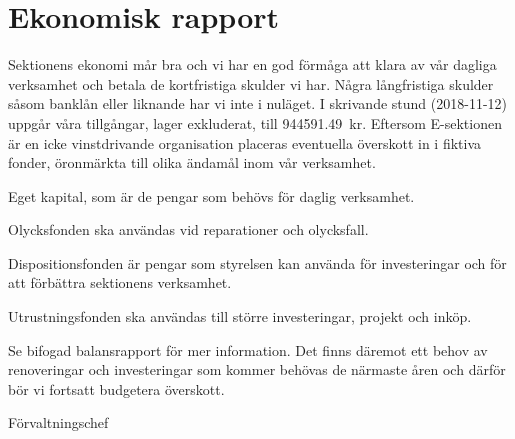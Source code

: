 \documentclass[../_main/handlingar.tex]{subfiles}
\begin{document}
\section{Ekonomisk rapport}
Sektionens ekonomi mår bra och vi har en god förmåga att klara av vår dagliga verksamhet och betala de kortfristiga skulder vi har. Några långfristiga skulder såsom banklån eller liknande har vi inte i nuläget.
I skrivande stund (2018-11-12) uppgår våra tillgångar, lager exkluderat, till \SI{944 591,49}{kr}. Eftersom E-sektionen är en icke vinstdrivande organisation placeras eventuella överskott in i fiktiva fonder, öronmärkta till olika ändamål inom vår verksamhet.
\begin{dashlist}
    \item Eget kapital, som är de pengar som behövs för daglig verksamhet.
    \item Olycksfonden ska användas vid reparationer och olycksfall.
    \item Dispositionsfonden är pengar som styrelsen kan använda för investeringar och för att förbättra sektionens verksamhet.
    \item Utrustningsfonden ska användas till större investeringar, projekt och inköp.
\end{dashlist}

Se bifogad balansrapport för mer information. Det finns däremot ett behov av renoveringar och investeringar som kommer behövas de närmaste åren och därför bör vi fortsatt budgetera överskott.

\begin{signatures}{1}
    \mvh
    \signature{Magnus Lundh}{Förvaltningschef}
\end{signatures}
\end{document}
